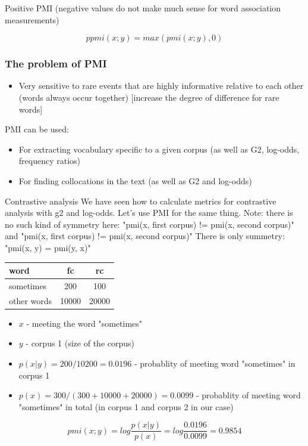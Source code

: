 \documentclass[svgnames]{beamer}
\begin{document}
\begin{frame}
    Positive PMI (negative values do not make much sense for word association measurements)

    $$
    ppmi(x;y) = max(pmi(x;y),0)
    $$
\end{frame}

\begin{frame}
  \frametitle{The problem of PMI}
  \begin{itemize}
  \item Very sensitive to rare events that are highly informative relative to each other (words always occur together)
    [increase the degree of difference for rare words]
  \end{itemize}
\end{frame}

\begin{frame}
  PMI can be used:
  \begin{itemize}
    \item For extracting vocabulary specific to a given corpus (as well as G2, log-odds, frequency ratios)
    \item For finding collocations in the text (as well as G2 and log-odds)
  \end{itemize}
\end{frame}

\begin{frame}{Contrastive analysis}
  We have seen how to calculate metrics for contrastive analysis with g2 and log-odds. Let's use PMI for the same thing.
  Note: there is no such kind of symmetry here: "pmi(x, first corpus) != pmi(x, second corpus)" and "pmi(x, first corpus) != pmi(x, second corpus)"
  There is only summetry: "pmi(x, y) = pmi(y, x)"
  \begin{tabular}[l]{lcc}
    word & fc & rc \\
    \hline
    sometimes & 200 & 100 \\
    other words & 10000 & 20000\\
  \end{tabular}

  \begin{itemize}
  \item $x$ - meeting the word "sometimes"
  \item $y$ - corpus 1 (size of the corpus)
  \item $p(x|y)= 200 / 10200 = 0.0196$ - probablity of meeting word "sometimes" in corpus 1
  \item $p(x)= 300 / (300+10000+20000) = 0.0099$ - probablity of meeting word "sometimes" in total (in corpus 1 and corpus 2 in our case)
  \end{itemize}
  
  $$pmi(x;y) = log \frac{p(x|y)}{p(x)} = log \frac{0.0196}{0.0099} = 0.9854$$
\end{frame}
\end{document}
